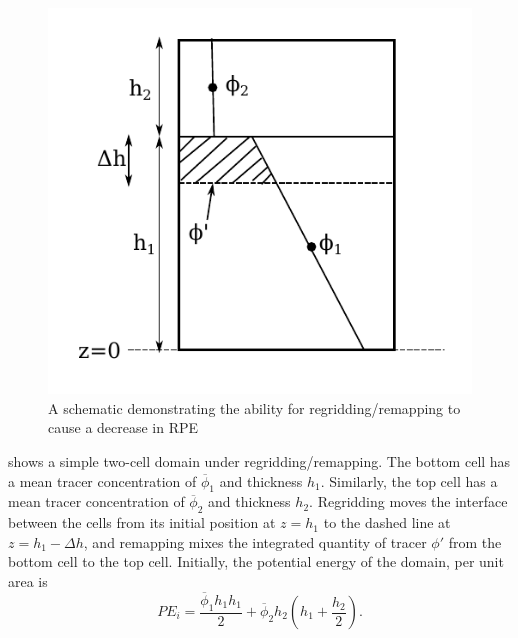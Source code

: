 \begin{figure}
  \includegraphics{../plots/schematic.pdf}
  \caption{\label{fig:schematic} A schematic demonstrating the ability for regridding/remapping to cause a decrease in RPE}
\end{figure}


 shows a simple two-cell domain under regridding/remapping. The bottom cell has a mean tracer concentration of $\overline\phi_1$ and thickness $h_1$. Similarly, the top cell has a mean tracer concentration of $\overline\phi_2$ and thickness $h_2$. Regridding moves the interface between the cells from its initial position at $z = h_1$ to the dashed line at $z = h_1 - \Delta h$, and remapping mixes the integrated quantity of tracer $\phi'$ from the bottom cell to the top cell. Initially, the potential energy of the domain, per unit area is
%
\begin{equation}
  PE_i = \frac{\overline\phi_1 h_1 h_1}{2} + \overline\phi_2 h_2\left(h_1 + \frac{h_2}{2}\right).
\end{equation}

